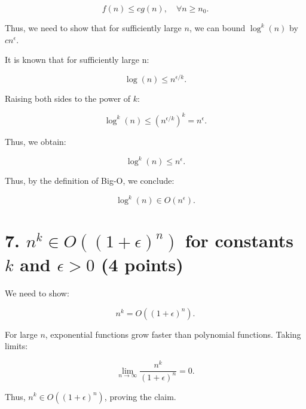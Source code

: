 \documentclass{article}
\begin{document}
\[
f(n) \leq c g(n), \quad \forall n \geq n_0.
\]

Thus, we need to show that for sufficiently large \( n \), we can bound \( \log^k(n) \) by \( c n^\epsilon \).

It is known that for sufficiently large n:

\[
\log(n) \leq n^{\epsilon / k}.
\]

Raising both sides to the power of \( k \):

\[
\log^k(n) \leq \left(n^{\epsilon / k} \right)^k = n^\epsilon.
\]

Thus, we obtain:

\[
\log^k(n) \leq n^\epsilon.
\]

Thus, by the definition of Big-O, we conclude:

\[
\log^k(n) \in O(n^\epsilon).
\]

\section*{7. \( n^k \in O((1+\epsilon)^n) \) for constants \( k \) and \( \epsilon > 0 \) (4 points)}

We need to show:

\[
n^k = O((1+\epsilon)^n).
\]

For large \( n \), exponential functions grow faster than polynomial functions. Taking limits:

\[
\lim_{n \to \infty} \frac{n^k}{(1+\epsilon)^n} = 0.
\]

Thus, \( n^k \in O((1+\epsilon)^n) \), proving the claim.
\end{document}

